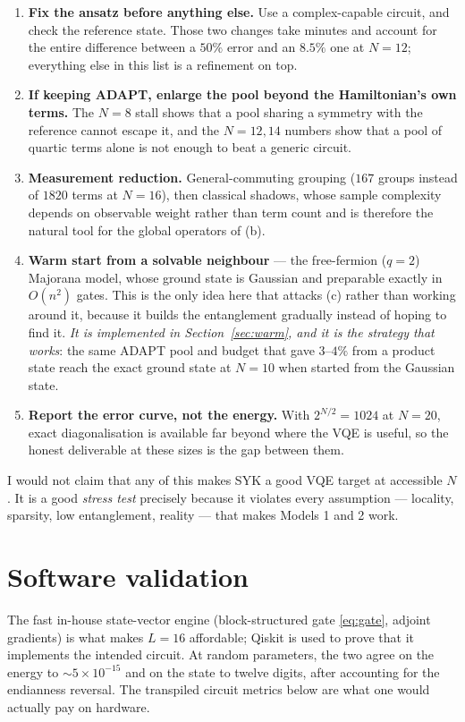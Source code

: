 \documentclass[10pt,a4paper]{article}
\begin{document}
\begin{enumerate}\itemsep3pt
\item \textbf{Fix the ansatz before anything else.} Use a complex-capable
  circuit, and check the reference state. Those two changes take minutes and
  account for the entire difference between a $50\%$ error and an $8.5\%$ one
  at $N=12$; everything else in this list is a refinement on top.
\item \textbf{If keeping ADAPT, enlarge the pool beyond the Hamiltonian's own
  terms.} The $N=8$ stall shows that a pool sharing a symmetry with the
  reference cannot escape it, and the $N=12,14$ numbers show that a pool of
  quartic terms alone is not enough to beat a generic circuit.
\item \textbf{Measurement reduction.} General-commuting grouping
  ($167$ groups instead of $1820$ terms at $N=16$), then classical shadows,
  whose sample complexity depends on observable weight rather than term count
  and is therefore the natural tool for the global operators of (b).
\item \textbf{Warm start from a solvable neighbour} --- the free-fermion
  ($q=2$) Majorana model, whose ground state is Gaussian and preparable exactly
  in $O(n^2)$ gates. This is the only idea here that attacks (c) rather than
  working around it, because it builds the entanglement gradually instead of
  hoping to find it. \emph{It is implemented in Section~\ref{sec:warm}, and it
  is the strategy that works}: the same ADAPT pool and budget that gave
  $3$--$4\%$ from a product state reach the exact ground state at $N=10$ when
  started from the Gaussian state.
\item \textbf{Report the error curve, not the energy.} With $2^{N/2}=1024$ at
  $N=20$, exact diagonalisation is available far beyond where the VQE is
  useful, so the honest deliverable at these sizes is the gap between them.
\end{enumerate}

I would not claim that any of this makes SYK a good VQE target at accessible
$N$. It is a good \emph{stress test} precisely because it violates every
assumption --- locality, sparsity, low entanglement, reality --- that makes
Models 1 and 2 work.

\section{Software validation}\label{sec:soft}

The fast in-house state-vector engine (block-structured gate
\eqref{eq:gate}, adjoint gradients) is what makes $L=16$ affordable; Qiskit is
used to prove that it implements the intended circuit. At random parameters,
the two agree on the energy to $\sim5\times10^{-15}$ and on the state to
twelve digits, after accounting for the endianness reversal. The transpiled
circuit metrics below are what one would actually pay on hardware.
\end{document}
